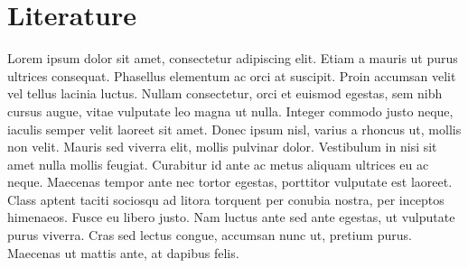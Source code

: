 \documentclass[../../main.tex]{subfiles}
\begin{document}

\chapter{Literature}

Lorem ipsum dolor sit amet, consectetur adipiscing elit. Etiam a mauris ut purus ultrices consequat. Phasellus elementum ac orci at suscipit. Proin accumsan velit vel tellus lacinia luctus. Nullam consectetur, orci et euismod egestas, sem nibh cursus augue, vitae vulputate leo magna ut nulla. Integer commodo justo neque, iaculis semper velit laoreet sit amet. Donec ipsum nisl, varius a rhoncus ut, mollis non velit. Mauris sed viverra elit, mollis pulvinar dolor. Vestibulum in nisi sit amet nulla mollis feugiat. Curabitur id ante ac metus aliquam ultrices eu ac neque. Maecenas tempor ante nec tortor egestas, porttitor vulputate est laoreet. Class aptent taciti sociosqu ad litora torquent per conubia nostra, per inceptos himenaeos. Fusce eu libero justo. Nam luctus ante sed ante egestas, ut vulputate purus viverra. Cras sed lectus congue, accumsan nunc ut, pretium purus. Maecenas ut mattis ante, at dapibus felis.




\end{document}
